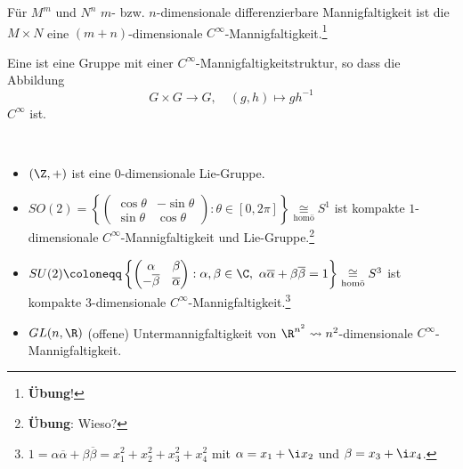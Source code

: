 \begin{example}
  Für \( M^m \) und \( N^n \) \( m \)- bzw. \( n \)-dimensionale differenzierbare Mannigfaltigkeit ist die \label{def:produktmannigfaltigkeit} \( M \times N \) eine \( (m+n) \)-dimensionale \( C^\infty \)-Mannigfaltigkeit.\footnote{\textbf{Übung}!}
\end{example}

\begin{excourse}
  Eine \label{def:liegruppe} ist eine Gruppe mit einer \( C^\infty \)-Mannigfaltigkeitstruktur, so dass die Abbildung
  \begin{equation*}
    G \times G \to G, \quad (g,h) \mapsto gh^{-1}
  \end{equation*}
  \( C^\infty \) ist.
\end{excourse}

\begin{example}
  \
  \begin{itemize}
    \item \( (\Z, +) \) ist eine \( 0 \)-dimensionale Lie-Gruppe.
    \item \( SO(2) = \left \{ \begin{pmatrix}
      \cos \theta & -\sin \theta \\
      \sin \theta & \cos \theta
    \end{pmatrix} : \theta \in [0, 2\pi] \right \} \underset{\text{homö}}{\cong} S^1 \) ist kompakte \( 1 \)-dimensionale \( C^\infty \)-Mannigfaltigkeit und Lie-Gruppe.\footnote{\textbf{Übung}: Wieso?} 
    \item \( SU(2) \coloneqq \left \{ \begin{pmatrix}
      \alpha & \beta \\
      -\overline{\beta} & \overline{\alpha}
    \end{pmatrix} : \alpha, \beta \in \C, \ \alpha\overline{\alpha}+\beta\overline{\beta} = 1 \right \} \underset{\text{homö}}{\cong} S^3 \) ist kompakte \( 3 \)-dimensionale \( C^\infty \)-Mannigfaltigkeit.\footnote{\( 1 = \alpha\overline{\alpha}+\beta\overline{\beta} = x_1^2 + x_2^2 + x_3^2 + x_4^2 \) mit \( \alpha = x_1+\i x_2 \) und \( \beta = x_3 + \i x_4 \).}
    \item \( GL(n, \R) \) (offene) Untermannigfaltigkeit von \( \R^{n^2} \leadsto n^2 \)-dimensionale \( C^\infty \)-Mannigfaltigkeit.
  \end{itemize}
\end{example}

